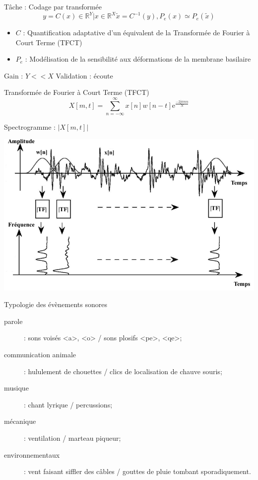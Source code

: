 \begin{frame}{\alert{Tâche} : Codage par transformée}
$$y = C(x) \in \mathbb{R}^Y | x \in \mathbb{R}^{X} \tilde{x} = C^{-1}(y), P_e(x) \simeq P_e(\tilde{x})$$
\begin{itemize}
\item $C$ : Quantification adaptative d'un équivalent de la Transformée de Fourier à Court Terme (TFCT)
\item $P_e$ : Modélisation de la sensibilité aux déformations de la membrane basilaire
\end{itemize}
Gain : $Y<<X$
Validation : écoute
\end{frame}

\begin{frame}{Transformée de Fourier à Court Terme (TFCT)}
$$ X[m, t] = \sum_{n = - \infty}^{\infty} x[n] w[n-t] \mathrm{e}^{\frac{-2 \mathrm{j}  \pi m n}{N}} $$
\end{frame}

\begin{frame}{Spectrogramme : $|X[m, t]|$}
\begin{center}
\includegraphics[width=.9\columnwidth]{figures/tfct} \\
\end{center}
\end{frame}

\begin{frame}{Typologie des évènements sonores}
\begin{description}
  \item[parole] : sons voisés <a>, <o> / sons plosifs <pe>, <qe>;
  \item[communication animale] : hululement de chouettes / clics de localisation de chauve souris;
  \item[musique] : chant lyrique / percussions;
  \item[mécanique] : ventilation / marteau piqueur;
  \item[environnementaux] : vent faisant siffler des câbles / gouttes de pluie tombant sporadiquement.
\end{description}
\end{frame}

